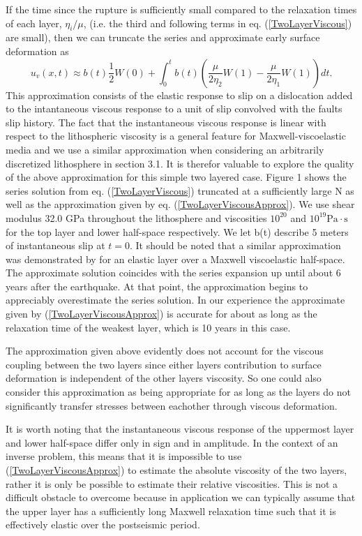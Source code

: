 \documentclass[12pt]{article}
\begin{document}
If the time since the rupture is sufficiently small compared to the
relaxation times of each layer, $\eta_i/\mu$, (i.e. the third and
following terms in eq. (\ref{TwoLayerViscous}) are small), then we can
truncate the series and approximate early surface deformation as
\begin{equation}\label{TwoLayerViscousApprox}
 u_v(x,t) \approx b(t)\frac{1}{2}W(0) + 
          \int_0^t b(t)\left(\frac{\mu}{2\eta_2}W(1) - \frac{\mu}{2\eta_1}W(1)\right)dt.
\end{equation} 
This approximation consists of the elastic response to slip on a
dislocation added to the intantaneous viscous response to a unit of
slip convolved with the faults slip history.  The fact that the
instantaneous viscous response is linear with respect to the
lithospheric viscosity is a general feature for Maxwell-viscoelastic
media and we use a similar approximation when considering an
arbitrarily discretized lithosphere in section 3.1.  It is therefor
valuable to explore the quality of the above approximation for this
simple two layered case. Figure 1 shows the series solution from
eq. (\ref{TwoLayerViscous}) truncated at a sufficiently large N as
well as the approximation given by eq. (\ref{TwoLayerViscousApprox}).
We use shear modulus 32.0 GPa throughout the lithosphere and
viscosities $10^{20}$ and $10^{19} \mathrm{Pa}\cdot\mathrm{s}$ for the
top layer and lower half-space respectively.  We let b(t) describe 5
meters of instantaneous slip at $t=0$.  It should be noted that a
similar approximation was demonstrated by \citet{S2010} for an elastic
layer over a Maxwell viscoelastic half-space.  The approximate
solution coincides with the series expansion up until about 6 years
after the earthquake.  At that point, the approximation begins to
appreciably overestimate the series solution.  In our experience the
approximate given by (\ref{TwoLayerViscousApprox}) is accurate for
about as long as the relaxation time of the weakest layer, which is 10
years in this case.

The approximation given above evidently does not account for the
viscous coupling between the two layers since either layers
contribution to surface deformation is independent of the other layers
viscosity.  So one could also consider this approximation as being
appropriate for as long as the layers do not significantly transfer
stresses between eachother through viscous deformation.

It is worth noting that the instantaneous viscous response of the
uppermost layer and lower half-space differ only in sign and in
amplitude.  In the context of an inverse problem, this means that it
is impossible to use (\ref{TwoLayerViscousApprox}) to estimate the
absolute viscosity of the two layers, rather it is only be possible to
estimate their relative viscosities.  This is not a difficult obstacle
to overcome because in application we can typically assume that the
upper layer has a sufficiently long Maxwell relaxation time such that
it is effectively elastic over the postseismic period.
\end{document}
